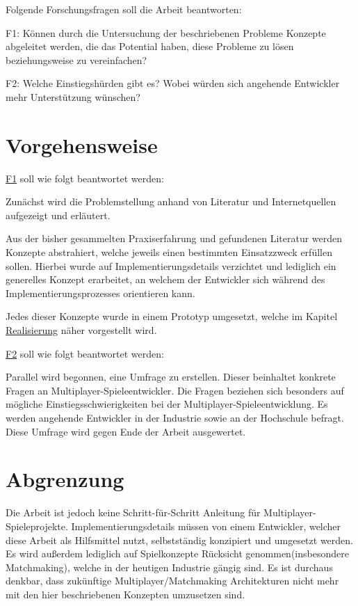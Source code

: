 Folgende Forschungsfragen soll die Arbeit beantworten:

\label{f1}F1: Können durch die Untersuchung der beschriebenen Probleme Konzepte abgeleitet werden, die das Potential haben, diese Probleme zu lösen beziehungsweise zu vereinfachen?

\label{f2}F2: Welche Einstiegshürden gibt es? Wobei würden sich angehende Entwickler mehr Unterstützung wünschen? 


\section{Vorgehensweise}

\hyperref[f1]{F1} soll wie folgt beantwortet werden:

Zunächst wird die Problemstellung anhand von Literatur und Internetquellen aufgezeigt und erläutert. 

Aus der bisher gesammelten Praxiserfahrung und gefundenen Literatur werden Konzepte abstrahiert, welche jeweils einen bestimmten Einsatzzweck erfüllen sollen. Hierbei wurde auf Implementierungsdetails verzichtet und lediglich ein generelles Konzept erarbeitet, an welchem der Entwickler sich während des Implementierungsprozesses orientieren kann.

Jedes dieser Konzepte wurde in einem Prototyp umgesetzt, welche im Kapitel \hyperref[sec:realisierung]{Realisierung} näher vorgestellt wird.

\hyperref[f2]{F2} soll wie folgt beantwortet werden:

Parallel wird begonnen, eine Umfrage zu erstellen. Dieser beinhaltet konkrete Fragen an Multiplayer-Spieleentwickler. Die Fragen beziehen sich besonders auf mögliche Einstiegsschwierigkeiten bei der Multiplayer-Spieleentwicklung. Es werden angehende Entwickler in der Industrie sowie an der Hochschule befragt. Diese Umfrage wird gegen Ende der Arbeit ausgewertet. 

\section{Abgrenzung}

Die Arbeit ist jedoch keine Schritt-für-Schritt Anleitung für Multiplayer-Spieleprojekte. Implementierungsdetails müssen von einem Entwickler, welcher diese Arbeit als Hilfsmittel nutzt, selbstständig konzipiert und umgesetzt werden. Es wird außerdem lediglich auf Spielkonzepte Rücksicht genommen(insbesondere Matchmaking), welche in der heutigen Industrie gängig sind\cite{Wikipedia.2021b}. Es ist durchaus denkbar, dass zukünftige Multiplayer/Matchmaking Architekturen nicht mehr mit den hier beschriebenen Konzepten umzusetzen sind.

